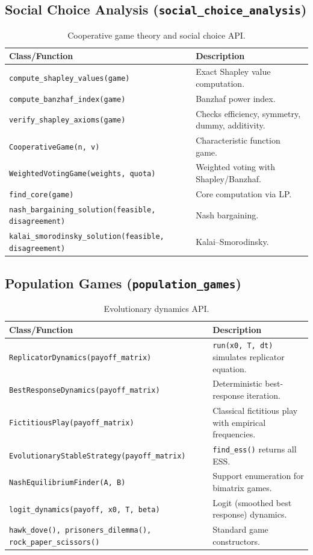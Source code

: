 \documentclass[10pt]{article}
\begin{document}
\subsection{Social Choice Analysis (\texttt{social\_choice\_analysis})}

\begin{table}[H]
\centering
\caption{Cooperative game theory and social choice API.}
\label{tab:api-social}
\begin{tabularx}{\textwidth}{lX}
\toprule
\textbf{Class/Function} & \textbf{Description} \\
\midrule
\texttt{compute\_shapley\_values(game)} & Exact Shapley value computation. \\
\texttt{compute\_banzhaf\_index(game)} & Banzhaf power index. \\
\texttt{verify\_shapley\_axioms(game)} & Checks efficiency, symmetry, dummy, additivity. \\
\texttt{CooperativeGame(n, v)} & Characteristic function game. \\
\texttt{WeightedVotingGame(weights, quota)} & Weighted voting with Shapley/Banzhaf. \\
\texttt{find\_core(game)} & Core computation via LP. \\
\texttt{nash\_bargaining\_solution(feasible, disagreement)} & Nash bargaining. \\
\texttt{kalai\_smorodinsky\_solution(feasible, disagreement)} & Kalai--Smorodinsky. \\
\bottomrule
\end{tabularx}
\end{table}

\subsection{Population Games (\texttt{population\_games})}

\begin{table}[H]
\centering
\caption{Evolutionary dynamics API.}
\label{tab:api-evo}
\begin{tabularx}{\textwidth}{lX}
\toprule
\textbf{Class/Function} & \textbf{Description} \\
\midrule
\texttt{ReplicatorDynamics(payoff\_matrix)} & \texttt{run(x0, T, dt)} simulates replicator equation. \\
\texttt{BestResponseDynamics(payoff\_matrix)} & Deterministic best-response iteration. \\
\texttt{FictitiousPlay(payoff\_matrix)} & Classical fictitious play with empirical frequencies. \\
\texttt{EvolutionaryStableStrategy(payoff\_matrix)} & \texttt{find\_ess()} returns all ESS. \\
\texttt{NashEquilibriumFinder(A, B)} & Support enumeration for bimatrix games. \\
\texttt{logit\_dynamics(payoff, x0, T, beta)} & Logit (smoothed best response) dynamics. \\
\texttt{hawk\_dove(), prisoners\_dilemma(), rock\_paper\_scissors()} & Standard game constructors. \\
\bottomrule
\end{tabularx}
\end{table}
\end{document}

